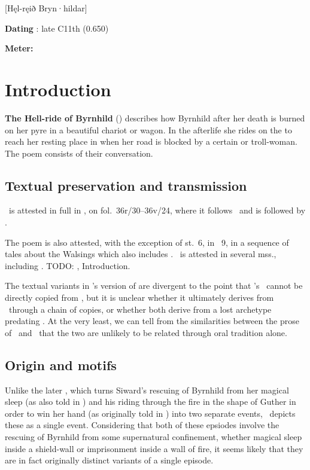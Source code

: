 [Hęl-ręið Bryn·hildar]

\begin{flushright}%
\textbf{Dating} \parencite{Sapp2022}: late C11th (0.650)

\textbf{Meter:} \Fornyrdislag
\end{flushright}%

\section{Introduction}

\textbf{The Hell-ride of Byrnhild} (\Helreid) describes how Byrnhild after her death is burned on her pyre in a beautiful chariot or wagon.  In the afterlife she rides on the  to reach her resting place in  when her road is blocked by a certain  or troll-woman.  The poem consists of their conversation.

\subsection{Textual preservation and transmission}

\Helreid\ is attested in full in \Regius, on fol.~36r/30--36v/24, where it follows \Sigurdskamma\ and is followed by \GudrunTwo.

The poem is also attested, with the exception of st.~6, in \Nornagest\ 9, in a sequence of tales about the Walsings which also includes .  \Nornagest\ is attested in several mss., including \FlatMS.  TODO: \textcite{Halldorsson2000}, Introduction.

The textual variants in \Nornagest’s version of \Helreid are divergent to the point that \Nornagest’s \Helreid\ cannot be directly copied from \Regius, but it is unclear whether it ultimately derives from \Regius\ through a chain of copies, or whether both derive from a lost archetype predating \Regius.  At the very least, we can tell from the similarities between the prose of \Nornagest\ and \Regius\ that the two are unlikely to be related through oral tradition alone.

\subsection{Origin and motifs}

Unlike the later \VolsungaSaga, which turns Siward’s rescuing of Byrnhild from her magical sleep (as also told in ) and his riding through the fire in the shape of Guther in order to win her hand (as originally told in ) into two separate events, \Helreid\ depicts these as a single event.  Considering that both of these epsiodes involve the rescuing of Byrnhild from some supernatural confinement, whether magical sleep inside a shield-wall or imprisonment inside a wall of fire, it seems likely that they are in fact originally distinct variants of a single episode.

